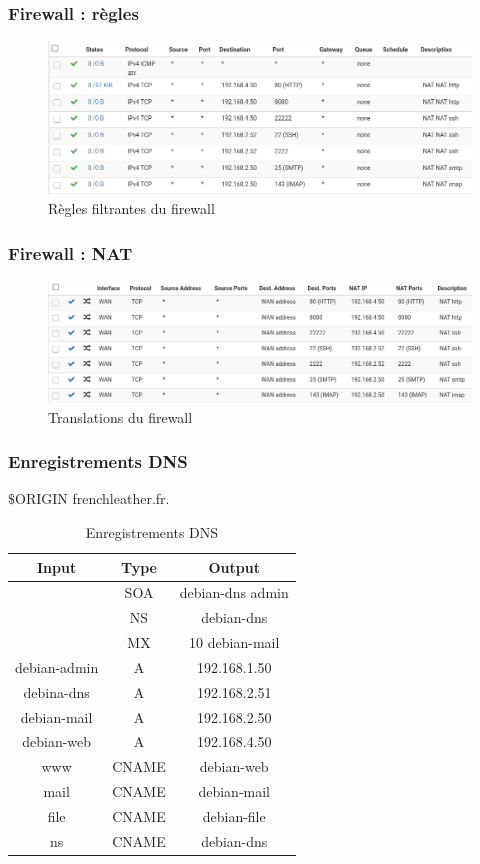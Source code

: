 \documentclass{beamer}
\begin{document}
		\begin{frame}
			\frametitle{Firewall : règles}
			\begin{center}
				\begin{figure}
					\includegraphics[scale=.3]{rule.png}
					\caption{Règles filtrantes du firewall}
				\end{figure}
			\end{center}
		\end{frame}
		\begin{frame}
			\frametitle{Firewall : NAT}
			\begin{center}
				\begin{figure}
					\includegraphics[scale=.3]{nat.png}
					\caption{Translations du firewall}
				\end{figure}
			\end{center}
		\end{frame}
		\begin{frame}
			\frametitle{Enregistrements DNS}
			$\$$ORIGIN frenchleather.fr.
			\begin{center}
				\begin{table}[h!]
					\centering
					\begin{tabular}{||c c c||}
						\hline
						Input & Type & Output \\
						\hline\hline
						 & SOA & debian-dns admin \\
						 & NS & debian-dns \\
						 & MX & 10 debian-mail \\
						debian-admin & A & 192.168.1.50 \\
						debina-dns & A & 192.168.2.51 \\
						debian-mail & A & 192.168.2.50 \\
						debian-web & A & 192.168.4.50 \\
						www & CNAME & debian-web \\
						mail & CNAME & debian-mail \\
						file & CNAME & debian-file \\
						ns & CNAME & debian-dns \\
						\hline
					\end{tabular}
					\caption{Enregistrements DNS}
					\label{table:1}
					\end{table}
			\end{center}
		\end{frame}
\end{document}
